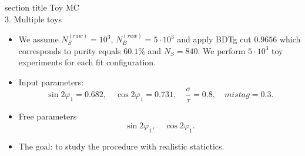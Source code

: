 \documentclass[10 pt,compress,mathserif]{beamer}
\begin{document}
\begin{frame}
 \centering
   \begin{beamercolorbox}[sep=8pt,center]{section title}
      Toy MC\\ 3. Multiple toys
   \end{beamercolorbox}
    
    \begin{block}{}
    \begin{itemize}
     \item We assume $N^{(raw)}_S=10^3$, $N^{(raw)}_{B}=5\cdot10^3$ and apply BDTg cut $0.9656$ which corresponds to purity equals $60.1\%$ and $N_S=840$. We perform $5\cdot 10^3$ toy experiments for each fit configuration.
     \item Input parameters:
     \begin{equation*}
      \sin2\varphi_1=0.682,\quad \cos2\varphi_1=0.731,\quad \frac{\sigma}{\tau}=0.8,\quad mistag = 0.3.
     \end{equation*}
     \item Free parameters
     \begin{equation*}
      \sin2\varphi_1,\quad \cos2\varphi_1.
     \end{equation*}
     \item The goal: to study the procedure with realistic statictics.
    \end{itemize}
    \end{block}
\end{frame}
\end{document}
